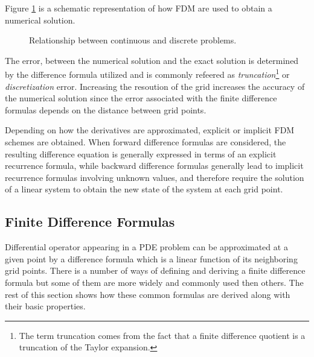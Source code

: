     Figure \ref{fig:schematic_repr_fdm} is a schematic representation of how FDM are used to obtain a numerical solution.
    \begin{figure}
    \centering
    \caption{Relationship between continuous and discrete problems.}
    \label{fig:schematic_repr_fdm}
\end{figure}
    
    The error, between the numerical solution and the exact solution is determined by the difference formula utilized and is commonly refeered as \textit{truncation}\footnote{The term truncation comes from the fact that a finite difference quotient is a truncation of the Taylor expansion.} or \textit{discretization} error.  Increasing the resoution of the grid increases the accuracy of the numerical solution since the error associated with the finite difference formulas depends on the distance between grid points.
    
        
    Depending on how the derivatives are approximated, explicit or implicit FDM schemes are
    obtained. When forward difference formulas are considered, the
    resulting difference equation is generally expressed in terms of
    an explicit recurrence formula, while backward difference formulas
    generally lead to implicit recurrence formulas involving unknown
    values, and therefore require the solution of a linear system to
    obtain the new state of the system at each grid point.
    
    
\subsection{Finite Difference Formulas}
Differential operator appearing in a PDE problem can be approximated at a given point by a difference formula which is a linear function of its neighboring grid points. There is a number of ways of defining and deriving a finite difference formula but some of them are more widely and commonly used then others. The rest of this section shows how  these common formulas are derived along with their basic properties. 

